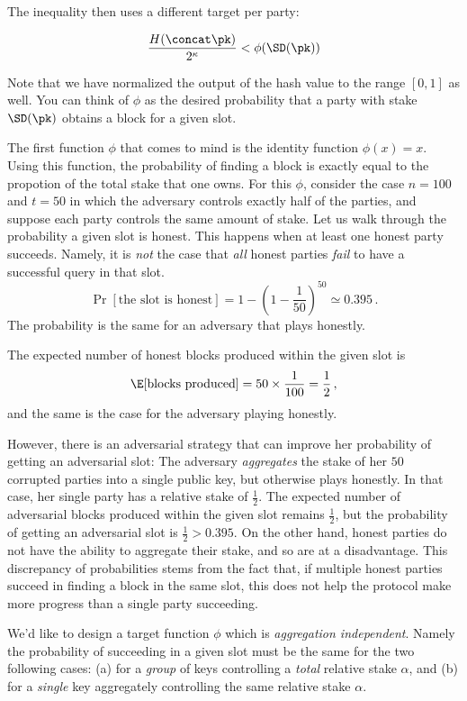 The inequality then uses a different target per party:

\[
  \frac{H(\sl \concat \pk)}{2^\kappa} < \phi(\SD(\pk))
\]

Note that we have normalized the output of the hash value to the range $[0, 1]$ as well.
You can think of $\phi$ as the desired probability that a party with stake $\SD(\pk)$
obtains a block for a given slot.

The first function $\phi$ that comes to mind is the identity function $\phi(x) = x$.
Using this function, the probability of finding a block is exactly equal to the propotion
of the total stake that one owns. For this $\phi$, consider the case $n = 100$ and $t = 50$
in which the adversary controls exactly half of the parties, and suppose each party controls
the same amount of stake. Let us walk through the probability a given slot is honest.
This happens when at least one honest party succeeds. Namely, it is \emph{not}
the case that \emph{all} honest parties \emph{fail} to have a successful query in that slot.
\[
  \Pr[\text{the slot is honest}] = 1 - (1 - \frac{1}{50})^{50} \simeq 0.395\,.
\]
The probability is the same for an adversary that plays honestly.

The expected number of honest blocks
produced within the given slot is
\[
  \E[\text{blocks produced}] = 50 \times \frac{1}{100} = \frac{1}{2}\,,
\]
and the same is the case for the adversary playing honestly.

However, there is an adversarial
strategy that can improve her probability of getting an adversarial slot: The adversary
\emph{aggregates} the stake of her $50$ corrupted parties into a single public key, but
otherwise plays honestly. In
that case, her single party has a relative stake of $\frac{1}{2}$.
The expected number of adversarial blocks produced within the given slot remains $\frac{1}{2}$,
but the probability of getting an
adversarial slot is $\frac{1}{2} > 0.395$. On the other hand, honest parties do not have the ability
to aggregate their stake, and so are at a disadvantage.
This discrepancy of probabilities stems from the fact that, if multiple honest parties succeed in
finding a block in the same slot, this does not help the protocol make more progress than a single party
succeeding.

We'd like to design a target function $\phi$ which is \emph{aggregation independent}.
Namely the probability of succeeding in a given slot must be the same for the two following cases:
(a) for a \emph{group} of keys controlling a \emph{total} relative stake $\alpha$, and
(b) for a \emph{single} key aggregately controlling the same relative stake $\alpha$.


